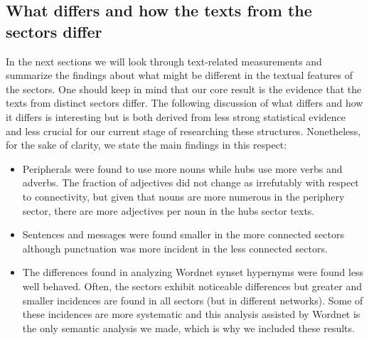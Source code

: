 																																									    
																																									    
																																									    
																																									    

																																									    \FloatBarrier
																																									    \subsection{What differs and how the texts from the sectors differ}
																																									    In the next sections we will look through text-related measurements
																																									    and summarize the findings about what might be different in
																																									    the textual features of the sectors.
																																									    One should keep in mind that our core result is the evidence that
																																									    the texts from distinct sectors differ.
																																									    The following discussion of what differs and how it differs
																																									    is interesting but is both derived from less strong statistical evidence and less crucial for our current stage of researching these structures.
																																									    Nonetheless, for the sake of clarity, we state the main findings in this respect:
																																									    \begin{itemize}
																																									    	\item Peripherals were found to use more nouns while hubs use more verbs and adverbs. The fraction of adjectives did not change as irrefutably with respect to connectivity, but given that nouns are more numerous in the periphery sector, there are more adjectives per noun in the hubs sector texts.
																																											\item Sentences and messages were found smaller in the more connected sectors although punctuation was more incident in the less connected sectors.
																																												\item The differences found in analyzing Wordnet synset hypernyms were found less well behaved. Often, the sectors exhibit noticeable differences but greater and smaller incidences are found in all sectors (but in different networks). Some of these incidences are more systematic and this analysis assisted by Wordnet is the only semantic analysis we made, which is why we included these results.
																																												\end{itemize}
